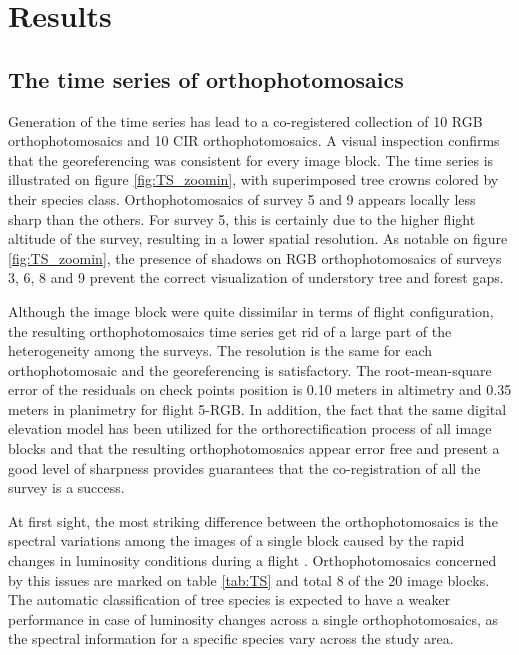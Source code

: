 \documentclass[remotesensing,article,submit,moreauthors,pdftex,12pt,a4paper]{mdpi} %
\begin{document}
\section{Results}

\subsection{The time series of orthophotomosaics}

Generation of the time series has lead to a co-registered collection of 10 RGB orthophotomosaics and 10 CIR orthophotomosaics. 
A visual inspection confirms that the georeferencing was consistent for every image block. 
The time series is illustrated on figure \ref{fig:TS_zoomin}, with superimposed tree crowns colored by their species class. 
Orthophotomosaics of survey 5 and 9 appears locally less sharp than the others. 
For survey 5, this is certainly due to the higher flight altitude of the survey, resulting in a lower spatial resolution.
As notable on figure \ref{fig:TS_zoomin}, the presence of shadows on RGB orthophotomosaics of surveys 3, 6, 8 and 9 prevent the correct visualization of understory tree and forest gaps.

Although the image block were quite dissimilar in terms of flight configuration, the resulting orthophotomosaics time series get rid of a large part of the heterogeneity among the surveys. 
The resolution is the same for each orthophotomosaic and the georeferencing is satisfactory. 
The root-mean-square error of the residuals on check points position is 0.10 meters in altimetry and 0.35 meters in planimetry for flight 5-RGB. %
In addition, the fact that the same digital elevation model has been utilized for the orthorectification process of all image blocks and that the resulting orthophotomosaics appear error free and present a good level of sharpness provides guarantees that the co-registration of all the survey is a success. 

At first sight, the most striking difference between the orthophotomosaics is the spectral variations among the images of a single block caused by the rapid changes in luminosity conditions during a flight \cite{honkavaara_digital_2009}. 
Orthophotomosaics concerned by this issues are marked on table \ref{tab:TS} and total 8 of the 20 image blocks. 
The automatic classification of tree species is expected to have a weaker performance in case of luminosity changes across a single orthophotomosaics, as the spectral information for a specific species vary across the study area.
\end{document}
